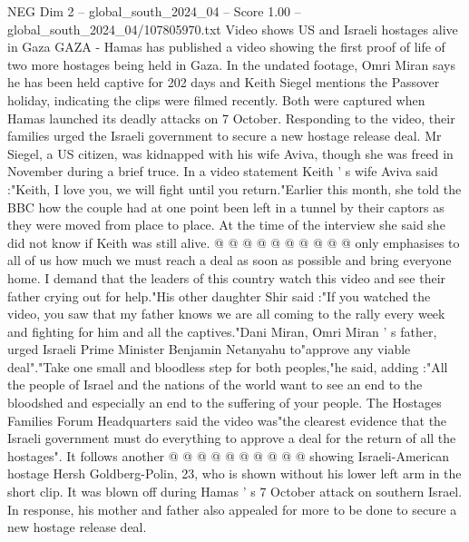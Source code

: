 \begin{textsample}{NEG Dim 2 – global\_south\_2024\_04 – Score 1.00 – global\_south\_2024\_04/107805970.txt}  \label{ex:f2_neg_290}
Video shows US and Israeli hostages alive in Gaza GAZA - Hamas has published a video showing the first proof of life of two more hostages being held in Gaza.
In the undated footage, Omri Miran says he has been held captive for 202 days and Keith Siegel mentions the Passover holiday, indicating the clips were filmed recently.
Both were captured when Hamas launched its deadly attacks on 7 October.
Responding to the video, their families urged the Israeli government to secure a new hostage release deal.
Mr Siegel, a US citizen, was kidnapped with his wife Aviva, though she was freed in November during a brief truce.
In a video statement Keith ' s wife Aviva said :"Keith, I love you, we will fight until you return."Earlier this month, she told the BBC how the couple had at one point been left in a tunnel by their captors as they were moved from place to place.
At the time of the interview she said she did not know if Keith was still alive. @ @ @ @ @ @ @ @ @ @ only emphasises to all of us how much we must reach a deal as soon as possible and bring everyone home.
I demand that the leaders of this country watch this video and see their father crying out for help."His other daughter Shir said :"If you watched the video, you saw that my father knows we are all coming to the rally every week and fighting for him and all the captives."Dani Miran, Omri Miran ' s father, urged Israeli Prime Minister Benjamin Netanyahu to"approve any viable deal"."Take one small and bloodless step for both peoples,"he said, adding :"All the people of Israel and the nations of the world want to see an end to the bloodshed and especially an end to the suffering of your people.
The Hostages Families Forum Headquarters said the video was"the clearest evidence that the Israeli government must do everything to approve a deal for the return of all the hostages".
It follows another @ @ @ @ @ @ @ @ @ @ showing Israeli-American hostage Hersh Goldberg-Polin, 23, who is shown without his lower left arm in the short clip.
It was blown off during Hamas ' s 7 October attack on southern Israel.
In response, his mother and father also appealed for more to be done to secure a new hostage release deal.

\end{textsample}
